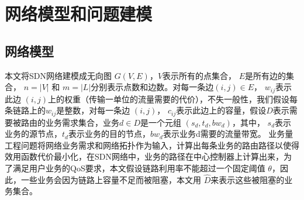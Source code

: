 \section{网络模型和问题建模}
\subsection{网络模型}
本文将SDN网络建模成无向图 $G(V, E)$，$V$表示所有的点集合， $E$是所有边的集合， $n = |V|$ 和 $m = |L|$分别表示点数和边数。对每一条边$(i,j)\in E$， $w_{ij}$表示此边 $(i,j)$上的权重（传输一单位的流量需要的代价），不失一般性，我们假设每条链路上的$w_{ij}$是整数，对每一条边 $(i,j)$， $c_{ij}$表示此边上的容量，假设$D$表示需要被路由的业务需求集合，业务$d \in D$是一个元组 $(s_d, t_d, bw_d)$，其中， $s_d$表示业务的源节点，$t_d$表示业务的目的节点，$bw_d$表示业务d需要的流量带宽。
业务量工程问题将网络业务需求和网络拓扑作为输入，计算出每条业务的路由路径以使得效用函数代价最小化，在SDN网络中，业务的路径在中心控制器上计算出来，为了满足用户业务的QoS要求，本文假设链路利用率不能超过一个固定阈值 $\theta$，因此，一些业务会因为链路上容量不足而被阻塞，本文用 $\hat{D}$来表示这些被阻塞的业务集合。
